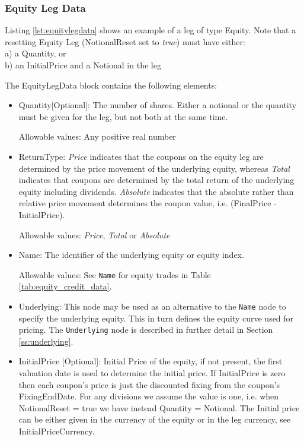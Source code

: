 \subsubsection{Equity Leg Data}
\label{ss:equitylegdata}

Listing \ref{lst:equitylegdata} shows an example of a leg of type Equity. Note that a resetting Equity Leg (NotionalReset set to  \emph{true}) must have either: \\
a) a Quantity, or \\
b) an InitialPrice and a Notional in the leg

The EquityLegData block contains the following elements:

\begin{itemize}
\item Quantity[Optional]: The number of shares. Either a notional or the quantity must be given for the leg, but not both at the same time.

  Allowable values: Any positive real number

\item ReturnType: \emph{Price} indicates that the coupons on the equity leg are determined by the price movement of the underlying equity, whereas  \emph{Total} indicates that coupons are determined by the total return of the underlying equity including dividends. \emph{Absolute} indicates that the absolute rather than relative price movement determines the coupon value, i.e. (FinalPrice - InitialPrice).

Allowable values:  \emph{Price}, \emph{Total} or \emph{Absolute}

\item Name: The identifier of the underlying equity or equity index.

Allowable values: See \lstinline!Name! for equity trades in Table \ref{tab:equity_credit_data}. \\

\item Underlying:  This node may be used as an alternative to the \lstinline!Name! node to specify the underlying equity. This in turn defines the equity curve used for pricing. The \lstinline!Underlying! node is described in further detail in Section \ref{ss:underlying}. \\

\item InitialPrice [Optional]: Initial Price of the equity, if not present, the first valuation date is used to
  determine the initial price. If InitialPrice is zero then each coupon's price is just the discounted fixing from the coupon's FixingEndDate. For any divisions we assume the value is one, i.e. when NotionalReset = true we have instead Quantity = Notional. The Initial price can be either given in the currency of the equity or in the leg
  currency, see InitialPriceCurrency.


\end{itemize}
